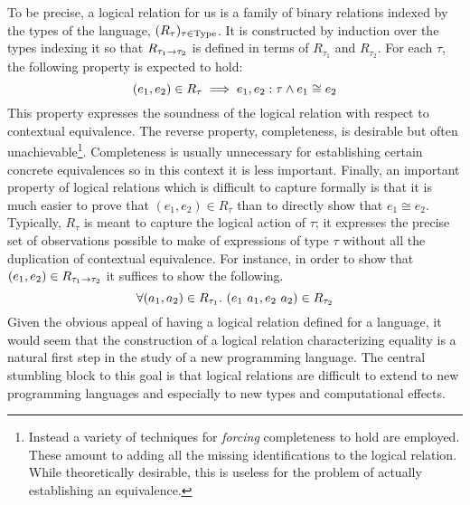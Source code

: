 To be precise, a logical relation for us is a family of binary
relations indexed by the types of the language,
$(R_\tau)_{\tau \in \mathrm{Type}}$. It is constructed by induction over the
types indexing it so that $R_{\tau_1 \to \tau_2}$ is defined in
terms of $R_{\tau_1}$ and $R_{\tau_2}$. For each $\tau$, the following
property is expected to hold:
\[
  (e_1, e_2) \in R_\tau \implies
  e_1, e_2 \mathrel{:} \tau \land e_1 \cong e_2
\]
This property expresses the soundness of the logical relation with
respect to contextual equivalence. The reverse property, completeness,
is desirable but often unachievable\footnote{Instead a variety of
  techniques for \emph{forcing} completeness to hold are
  employed. These amount to adding all the missing identifications to
  the logical relation. While theoretically desirable, this is useless
  for the problem of actually establishing an
  equivalence.}. Completeness is usually unnecessary for establishing
certain concrete equivalences so in this context it is less
important. Finally, an important property of logical relations which
is difficult to capture formally is that it is much easier to prove
that $(e_1, e_2) \in R_\tau$ than to directly show that
$e_1 \cong e_2$. Typically, $R_\tau$ is meant to capture the logical
action of $\tau$; it expresses the precise set of observations
possible to make of expressions of type $\tau$ without all the
duplication of contextual equivalence. For instance, in order to show
that $(e_1, e_2) \in R_{\tau_1 \to \tau_2}$ it suffices to show the
following.
\[
  \forall (a_1, a_2) \in R_{\tau_1}.
  \ (e_1\ a_1, e_2\ a_2) \in R_{\tau_2}
\]
Given the obvious appeal of having a logical relation defined for a
language, it would seem that the construction of a logical relation
characterizing equality is a natural first step in the study of a new
programming language. The central stumbling block to this goal is that
logical relations are difficult to extend to new programming languages
and especially to new types and computational effects.

